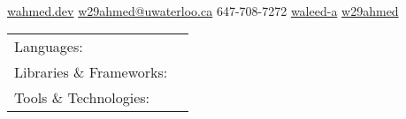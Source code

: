 \documentclass[]{awesome-cv}
\begin{document}
    
\begin{center}
	  \\
	\vspace{2mm}
	\href{https://wahmed.dev}{{\textcolor{darkblue}{\faGlobe} wahmed.dev}}
	\hspace{2mm}
	\href{mailto:w29ahmed@uwaterloo.ca}{{\textcolor{darkblue}{\faEnvelope} w29ahmed@uwaterloo.ca}}
	\hspace{2mm} 
	{\textcolor{darkblue}{\faPhone} 647-708-7272} 
	\hspace{2mm}
	\href{https://www.linkedin.com/in/waleed-a}{{\textcolor{darkblue}{\faLinkedin} waleed-a}}
	\hspace{2mm} 
	\href{https://github.com/w29ahmed}{{\textcolor{darkblue}{\faGithub} w29ahmed}}
\end{center}
\vspace{-4mm}
\begin{cventries}
	\cventry
	{}
	{\def\arraystretch{1.15}{\begin{tabular}{ l l }
		Languages:  & \hspace{1mm} {\skill{ C++, C, Python, JavaScript, Java, C\#, HTML, CSS, SQL, QML, Assembly}} \\
		Libraries \& Frameworks:  & \hspace{1mm} {\skill{ ROS, OpenCV, Qt, Node, React, Express, Flask, Google Test, TensorFlow}} \\
		Tools \& Technologies:  & \hspace{1mm} {\skill{ Git, Linux, QNX, Perforce, SVN, MongoDB, Jenkins, Docker, LaTeX, Jira}} \\
		\end{tabular}}}
	{}
	{}
	{}
\end{cventries}
\end{document}

